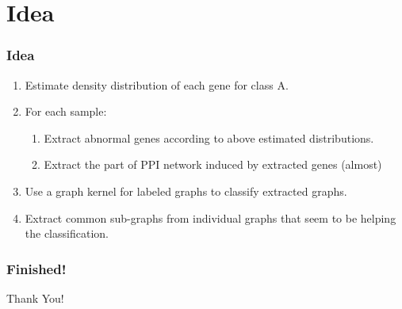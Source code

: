 \documentclass{beamer}
\begin{document}
\section{Idea}
\begin{frame}
\frametitle{Idea}
\begin{enumerate}
\item Estimate density distribution of each gene for class A. \pause
\item For each sample:
  \begin{enumerate}
  \item Extract abnormal genes according to above estimated distributions.
  \item Extract the part of PPI network induced by extracted genes (almost)
  \end{enumerate}\pause
\item Use a graph kernel for labeled graphs to classify extracted graphs. \pause
\item Extract common sub-graphs from individual graphs that seem to be helping the classification.
\end{enumerate}
\end{frame}

\begin{frame}[plain]
\frametitle{Finished!}
  \begin{center}
    \Huge{Thank You!}
  \end{center}
\end{frame}
\end{document}
